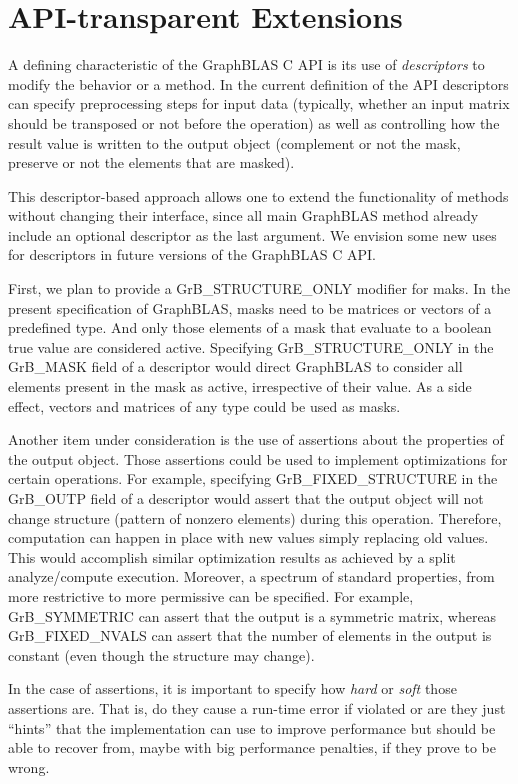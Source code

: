 \section{API-transparent Extensions}
\label{Sec:Extensions}

A defining characteristic of the GraphBLAS C API is its use of
\emph{descriptors} to modify the behavior or a method.  In the current
definition of the API descriptors can specify preprocessing steps for
input data (typically, whether an input matrix should be transposed or
not before the operation) as well as controlling how the result value
is written to the output object (complement or not the mask, preserve
or not the elements that are masked).

This descriptor-based approach allows one to extend the functionality of
methods without changing their interface, since all main GraphBLAS method
already include an optional descriptor as the last argument. We envision
some new uses for descriptors in future versions of the GraphBLAS C API.

First, we plan to provide a {\sf GrB\_STRUCTURE\_ONLY} modifier for maks.
In the present specification of GraphBLAS, masks need to be matrices
or vectors of a predefined type. And only those elements of a mask
that evaluate to a boolean {\sf true} value are considered active.
Specifying {\sf GrB\_STRUCTURE\_ONLY} in the {\sf GrB\_MASK} field of
a descriptor would direct GraphBLAS to consider all elements present
in the mask as active, irrespective of their value.  As a side effect,
vectors and matrices of any type could be used as masks.

Another item under consideration is the use of assertions about the
properties of the output object. Those assertions could be used to
implement optimizations for certain operations. For example, specifying
{\sf GrB\_FIXED\_STRUCTURE} in the {\sf GrB\_OUTP} field of a descriptor
would assert that the output object will not change structure (pattern
of nonzero elements) during this operation. Therefore, computation
can happen in place with new values simply replacing old values. This
would accomplish similar optimization results as achieved by a split
analyze/compute execution. Moreover, a spectrum of standard properties,
from more restrictive to more permissive can be specified. For example,
{\sf GrB\_SYMMETRIC} can assert that the output is a symmetric matrix,
whereas {\sf GrB\_FIXED\_NVALS} can assert that the number of elements
in the output is constant (even though the structure may change).

In the case of assertions, it is important to specify how \emph{hard}
or \emph{soft} those assertions are. That is, do they cause a run-time
error if violated or are they just ``hints'' that the implementation
can use to improve performance but should be able to recover from,
maybe with big performance penalties, if they prove to be wrong.
